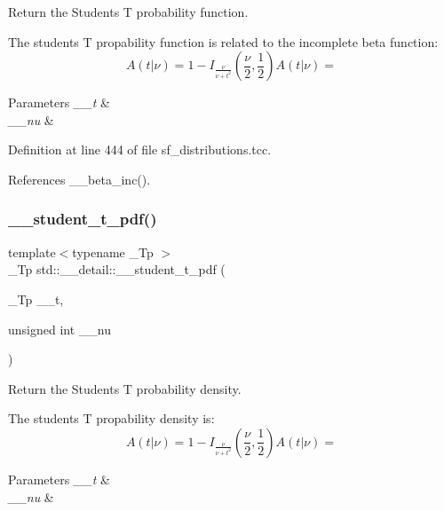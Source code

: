 Return the Students T probability function. 

The students T propability function is related to the incomplete beta function\+: \[ A(t|\nu) = 1 - I_{\frac{\nu}{\nu + t^2}}(\frac{\nu}{2}, \frac{1}{2}) A(t|\nu) = \]


\begin{DoxyParams}{Parameters}
{\em \+\_\+\+\_\+t} & \\
\hline
{\em \+\_\+\+\_\+nu} & \\
\hline
\end{DoxyParams}


Definition at line 444 of file sf\+\_\+distributions.\+tcc.



References \+\_\+\+\_\+beta\+\_\+inc().

\mbox{\label{namespacestd_1_1____detail_a866bf8f03fd2d5de5024837727beecd8}} 
\subsubsection{\texorpdfstring{\+\_\+\+\_\+student\+\_\+t\+\_\+pdf()}{\_\_student\_t\_pdf()}}
{\footnotesize\ttfamily template$<$typename \+\_\+\+Tp $>$ \\
\+\_\+\+Tp std\+::\+\_\+\+\_\+detail\+::\+\_\+\+\_\+student\+\_\+t\+\_\+pdf (\begin{DoxyParamCaption}\item[{\+\_\+\+Tp}]{\+\_\+\+\_\+t,  }\item[{unsigned int}]{\+\_\+\+\_\+nu }\end{DoxyParamCaption})}



Return the Students T probability density. 

The students T propability density is\+: \[ A(t|\nu) = 1 - I_{\frac{\nu}{\nu + t^2}}(\frac{\nu}{2}, \frac{1}{2}) A(t|\nu) = \]


\begin{DoxyParams}{Parameters}
{\em \+\_\+\+\_\+t} & \\
\hline
{\em \+\_\+\+\_\+nu} & \\
\hline
\end{DoxyParams}


